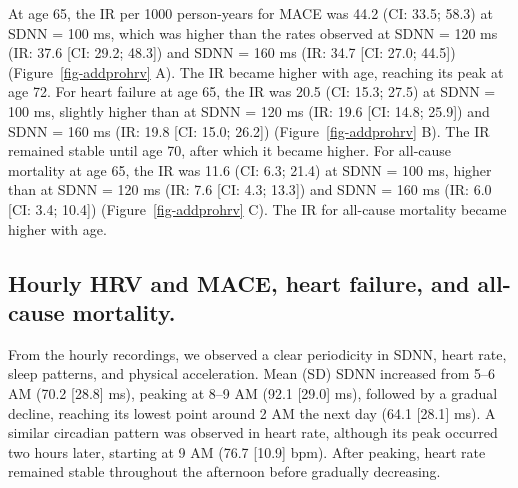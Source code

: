 \documentclass[
  a4paper,
  headsepline=true,
  open=any]{scrbook}
\begin{document}
At age 65, the IR per 1000 person-years for MACE was 44.2 (CI: 33.5;
58.3) at SDNN = 100 ms, which was higher than the rates observed at SDNN
= 120 ms (IR: 37.6 {[}CI: 29.2; 48.3{]}) and SDNN = 160 ms (IR: 34.7
{[}CI: 27.0; 44.5{]}) (Figure~\ref{fig-addprohrv} A). The IR became
higher with age, reaching its peak at age 72. For heart failure at age
65, the IR was 20.5 (CI: 15.3; 27.5) at SDNN = 100 ms, slightly higher
than at SDNN = 120 ms (IR: 19.6 {[}CI: 14.8; 25.9{]}) and SDNN = 160 ms
(IR: 19.8 {[}CI: 15.0; 26.2{]}) (Figure~\ref{fig-addprohrv} B). The IR
remained stable until age 70, after which it became higher. For
all-cause mortality at age 65, the IR was 11.6 (CI: 6.3; 21.4) at SDNN =
100 ms, higher than at SDNN = 120 ms (IR: 7.6 {[}CI: 4.3; 13.3{]}) and
SDNN = 160 ms (IR: 6.0 {[}CI: 3.4; 10.4{]}) (Figure~\ref{fig-addprohrv}
C). The IR for all-cause mortality became higher with age.

\hypertarget{hourly-hrv-and-mace-heart-failure-and-all-cause-mortality.}{%
\subsection{Hourly HRV and MACE, heart failure, and all-cause
mortality.}\label{hourly-hrv-and-mace-heart-failure-and-all-cause-mortality.}}

From the hourly recordings, we observed a clear periodicity in SDNN,
heart rate, sleep patterns, and physical acceleration. Mean (SD) SDNN
increased from 5--6 AM (70.2 {[}28.8{]} ms), peaking at 8--9 AM (92.1
{[}29.0{]} ms), followed by a gradual decline, reaching its lowest point
around 2 AM the next day (64.1 {[}28.1{]} ms). A similar circadian
pattern was observed in heart rate, although its peak occurred two hours
later, starting at 9 AM (76.7 {[}10.9{]} bpm). After peaking, heart rate
remained stable throughout the afternoon before gradually decreasing.
\end{document}
